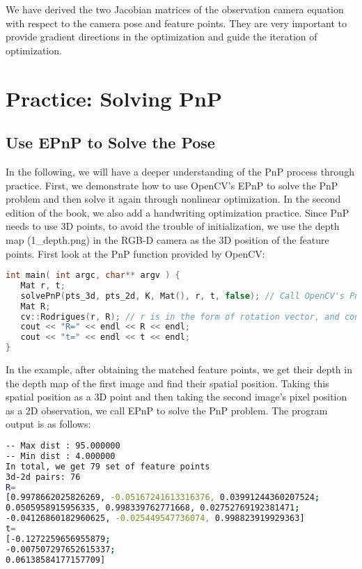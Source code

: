 We have derived the two Jacobian matrices of the observation camera equation with respect to the camera pose and feature points. They are very important to provide gradient directions in the optimization and guide the iteration of optimization.

\section{Practice: Solving PnP}
\subsection{Use EPnP to Solve the Pose}
In the following, we will have a deeper understanding of the PnP process through practice. First, we demonstrate how to use OpenCV's EPnP to solve the PnP problem and then solve it again through nonlinear optimization. In the second edition of the book, we also add a handwriting optimization practice. Since PnP needs to use 3D points, to avoid the trouble of initialization, we use the depth map (1_depth.png) in the RGB-D camera as the 3D position of the feature points. First look at the PnP function provided by OpenCV:

\begin{lstlisting}[language=c++,caption=slambook2/ch7/pose_estimation_3d2d.cpp (part)]
int main( int argc, char** argv ) {
   Mat r, t;
   solvePnP(pts_3d, pts_2d, K, Mat(), r, t, false); // Call OpenCV's PnP, you can choose from EPNP, DLS and other methods
   Mat R;
   cv::Rodrigues(r, R); // r is in the form of rotation vector, and converted to a rotation matrix by Rodrigues formula
   cout << "R=" << endl << R << endl;
   cout << "t=" << endl << t << endl;
}
\end{lstlisting}

In the example, after obtaining the matched feature points, we get their depth in the depth map of the first image and find their spatial position. Taking this spatial position as a 3D point and then taking the second image's pixel position as a 2D observation, we call EPnP to solve the PnP problem. The program output is as follows:

\begin{lstlisting}[language=sh,caption=Terminal output:]
% build/pose_estimation_3d2d 1.png 2.png d1.png d2.png
-- Max dist : 95.000000 
-- Min dist : 4.000000 
In total, we get 79 set of feature points
3d-2d pairs: 76
R=
[0.9978662025826269, -0.05167241613316376, 0.03991244360207524;
0.0505958915956335, 0.998339762771668, 0.02752769192381471;
-0.04126860182960625, -0.025449547736074, 0.998823919929363]
t=
[-0.1272259656955879;
-0.007507297652615337;
0.06138584177157709]
\end{lstlisting}


